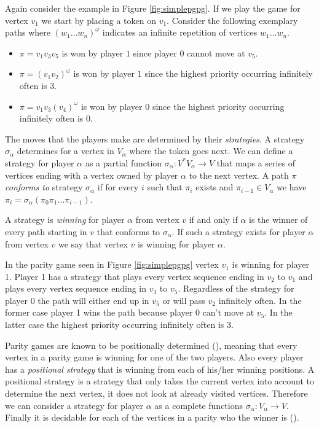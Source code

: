 \begin{example}
	Again consider the example in Figure \ref{fig:simplepgpg}. If we play the game for vertex $v_1$ we start by placing a token on $v_1$. Consider the following exemplary paths where $(w_1{\dots}w_n)^\omega$ indicates an infinite repetition of vertices $w_1{\dots}w_n$.
	\begin{itemize}
		\item $\pi = v_1v_3v_5$ is won by player $1$ since player $0$ cannot move at $v_5$.
		\item $\pi = (v_1v_2)^\omega$ is won by player $1$ since the highest priority occurring infinitely often is 3.
		\item $\pi = v_1v_3(v_4)^\omega$ is won by player $0$ since the highest priority occurring infinitely often is $0$.
	\end{itemize}
\end{example}

The moves that the players make are determined by their \textit{strategies}. A strategy $\sigma_\alpha$ determines for a vertex in $V_\alpha$ where the token goes next. We can define a strategy for player $\alpha$ as a partial function $\sigma_\alpha : V^*V_\alpha \rightarrow V$ that maps a series of vertices ending with a vertex owned by player $\alpha$ to the next vertex. A path $\pi$ \textit{conforms to} strategy $\sigma_\alpha$ if for every $i$ such that $\pi_i$ exists and $\pi_{i-1} \in V_\alpha$ we have $\pi_i = \sigma_\alpha(\pi_0\pi_1\dots\pi_{i-1})$.

A strategy is \textit{winning} for player $\alpha$ from vertex $v$ if and only if $\alpha$ is the winner of every path starting in $v$ that conforms to $\sigma_\alpha$. If such a strategy exists for player $\alpha$ from vertex $v$ we say that vertex $v$ is winning for player $\alpha$.

\begin{example}
	In the parity game seen in Figure \ref{fig:simplepgpg} vertex $v_1$ is winning for player 1. Player 1 has a strategy that plays every vertex sequence ending in $v_2$ to $v_1$ and plays every vertex sequence ending in $v_3$ to $v_5$. Regardless of the strategy for player 0 the path will either end up in $v_5$ or will pass $v_2$ infinitely often. In the former case player 1 wins the path because player 0 can't move at $v_5$. In the latter case the highest priority occurring infinitely often is 3.
\end{example}

Parity games are known to be positionally determined (\cite{Bradfield2018}), meaning that every vertex in a parity game is winning for one of the two players. Also every player has a \textit{positional strategy} that is winning from each of his/her winning positions. A positional strategy is a strategy that only takes the current vertex into account to determine the next vertex, it does not look at already visited vertices. Therefore we can consider a strategy for player $\alpha$ as a complete functions $\sigma_\alpha : V_\alpha \rightarrow V$. Finally it is decidable for each of the vertices in a parity who the winner is (\cite{Bradfield2018}).

